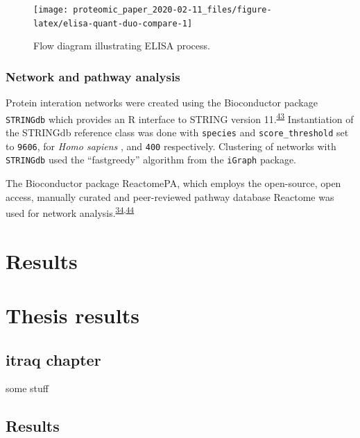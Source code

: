 \documentclass[
]{article}
\begin{document}
\clearpage



\begin{figure}
\texttt{[image: proteomic\_paper\_2020-02-11\_files/figure-latex/elisa-quant-duo-compare-1]} \caption{Flow diagram illustrating ELISA process.}\label{fig:elisa-quant-duo-compare}
\end{figure}

\hypertarget{pathway-analysis-chap3}{%
\subsubsection{Network and pathway analysis}\label{pathway-analysis-chap3}}

Protein interation networks were created using the Bioconductor package \texttt{STRINGdb} which provides an R interface to STRING version 11.\textsuperscript{\protect\hyperlink{ref-szklarczyk_string_2019}{43}}
Instantiation of the STRINGdb reference class was done with \texttt{species} and \texttt{score\_threshold} set to \texttt{9606}, for \emph{Homo sapiens} , and \texttt{400} respectively.
Clustering of networks with \texttt{STRINGdb} used the ``fastgreedy'' algorithm from the \texttt{iGraph} package.

The Bioconductor package ReactomePA, which employs the open-source, open access, manually curated and peer-reviewed pathway database Reactome was used for network analysis.\textsuperscript{\protect\hyperlink{ref-yu_reactomepa_2016}{34},\protect\hyperlink{ref-jassal_reactome_2020}{44}}

\hypertarget{results}{%
\section{Results}\label{results}}

\hypertarget{thesis-results}{%
\section{Thesis results}\label{thesis-results}}

\hypertarget{itraq-chapter}{%
\subsection{itraq chapter}\label{itraq-chapter}}

some stuff

\hypertarget{chap-3-results}{%
\subsection{Results}\label{chap-3-results}}
\end{document}
